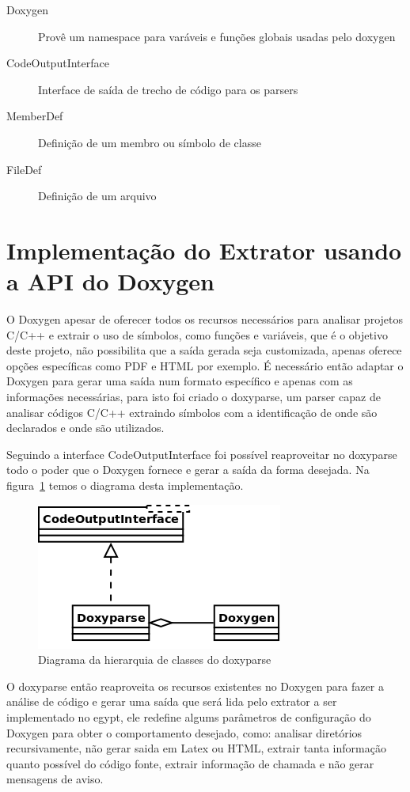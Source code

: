 \begin{description}
\item[Doxygen] Provê um namespace para varáveis e funções globais usadas pelo doxygen
\item[CodeOutputInterface] Interface de saída de trecho de código para os parsers
\item[MemberDef] Definição de um membro ou símbolo de classe
\item[FileDef] Definição de um arquivo
\end{description}


\section{Implementação do Extrator usando a API do Doxygen}

O Doxygen apesar de oferecer todos os recursos necessários para
analisar projetos C/C++ e extrair o uso de símbolos, como funções e variáveis,
que é o objetivo deste projeto, não possibilita que a saída gerada seja
customizada, apenas oferece opções específicas como PDF e HTML por exemplo. É
necessário então adaptar o Doxygen para gerar uma saída num formato
específico e apenas com as informações necessárias, para isto foi criado o
doxyparse, um parser capaz de analisar códigos C/C++ extraindo símbolos
com a identificação de onde são declarados e onde são utilizados.

Seguindo a interface CodeOutputInterface foi possível reaproveitar no doxyparse
todo o poder que o Doxygen fornece e gerar a saída da forma desejada. Na
figura~\ref{doxyparse-diagram} temos o diagrama desta implementação.

\begin{figure}[h]
\center
\includegraphics[scale=0.4]{imagens/doxyparse-diagram}
\caption{Diagrama da hierarquia de classes do doxyparse}
\label{doxyparse-diagram}
\end{figure}

O doxyparse então reaproveita os recursos existentes no Doxygen para fazer a
análise de código e gerar uma saída que será lida pelo extrator a ser
implementado no egypt, ele redefine algums parâmetros de configuração
do Doxygen para obter o comportamento desejado, como: analisar diretórios
recursivamente, não gerar saida em Latex ou HTML, extrair tanta informação
quanto possível do código fonte, extrair informação de chamada e não gerar
mensagens de aviso.

